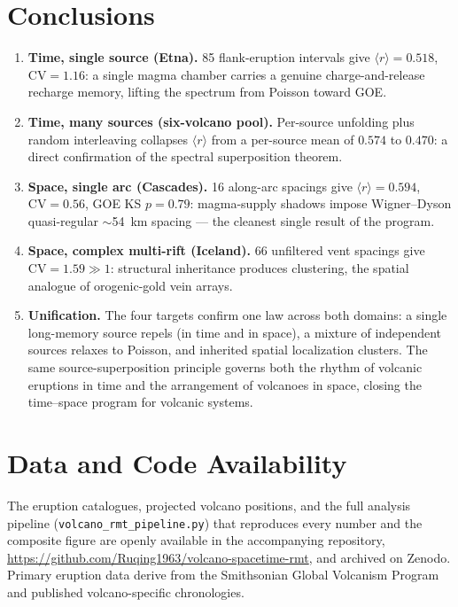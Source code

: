 \documentclass[11pt]{article}
\begin{document}
\section{Conclusions}
\begin{enumerate}
\item \textbf{Time, single source (Etna).} 85 flank-eruption intervals give
$\langle r\rangle=0.518$, $\mathrm{CV}=1.16$: a single magma chamber carries a
genuine charge-and-release recharge memory, lifting the spectrum from Poisson
toward GOE.
\item \textbf{Time, many sources (six-volcano pool).} Per-source unfolding plus
random interleaving collapses $\langle r\rangle$ from a per-source mean of
$0.574$ to $0.470$: a direct confirmation of the spectral superposition
theorem.
\item \textbf{Space, single arc (Cascades).} 16 along-arc spacings give
$\langle r\rangle=0.594$, $\mathrm{CV}=0.56$, GOE KS $p=0.79$: magma-supply
shadows impose Wigner--Dyson quasi-regular $\sim$54~km spacing --- the cleanest
single result of the program.
\item \textbf{Space, complex multi-rift (Iceland).} 66 unfiltered vent spacings
give $\mathrm{CV}=1.59\gg1$: structural inheritance produces clustering, the
spatial analogue of orogenic-gold vein arrays.
\item \textbf{Unification.} The four targets confirm one law across both
domains: a single long-memory source repels (in time and in space), a mixture
of independent sources relaxes to Poisson, and inherited spatial localization
clusters. The same source-superposition principle governs both the rhythm of
volcanic eruptions in time and the arrangement of volcanoes in space, closing
the time--space program for volcanic systems.
\end{enumerate}

\section*{Data and Code Availability}
The eruption catalogues, projected volcano positions, and the full analysis
pipeline (\texttt{volcano\_\allowbreak rmt\_\allowbreak pipeline.py}) that
reproduces every number and the composite figure are openly available in the
accompanying repository,
\url{https://github.com/Ruqing1963/volcano-spacetime-rmt}, and archived on
Zenodo. Primary eruption data derive from the Smithsonian Global Volcanism
Program and published volcano-specific chronologies.
\end{document}
